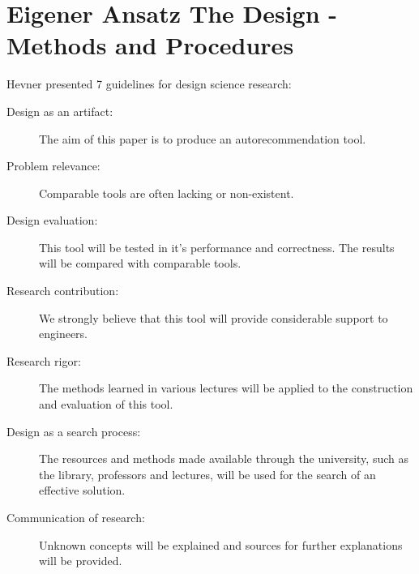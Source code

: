 \documentclass[10pt,a4paper,oneside]{scrartcl}
\begin{document}
	\section{
		{Eigener Ansatz}
		{The Design - Methods and Procedures}}
	\label{sec:approach}
	Hevner presented 7 guidelines for design science research:
	\begin{description}
		\item[Design as an artifact:] The aim of this paper is to produce an autorecommendation tool.
		\item [Problem relevance:] Comparable tools are often lacking or non-existent.
		\item [Design evaluation:] This tool will be tested in it's performance and correctness. The results will be compared with comparable tools.
		\item [Research contribution:] We strongly believe that this tool will provide considerable support to engineers.
		\item [Research rigor:] The methods learned in various lectures will be applied to the construction and evaluation of this tool.
		\item [Design as a search process:] The resources and methods made available through the university, such as the library, professors and lectures, will be used for the search of an effective solution.
		\item [Communication of research:] Unknown concepts will be explained and sources for further explanations will be provided. 
	\end{description}
	
\end{document}
